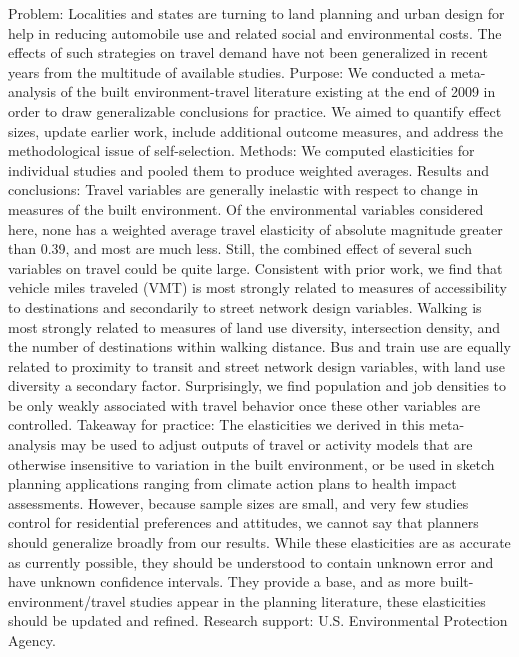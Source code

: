  Problem: Localities and states are turning to land planning and urban design for help in reducing automobile use and related social and environmental costs. The effects of such strategies on travel demand have not been generalized in recent years from the multitude of available studies. Purpose: We conducted a meta-analysis of the built environment-travel literature existing at the end of 2009 in order to draw generalizable conclusions for practice. We aimed to quantify effect sizes, update earlier work, include additional outcome measures, and address the methodological issue of self-selection. Methods: We computed elasticities for individual studies and pooled them to produce weighted averages. Results and conclusions: Travel variables are generally inelastic with respect to change in measures of the built environment. Of the environmental variables considered here, none has a weighted average travel elasticity of absolute magnitude greater than 0.39, and most are much less. Still, the combined effect of several such variables on travel could be quite large. Consistent with prior work, we find that vehicle miles traveled (VMT) is most strongly related to measures of accessibility to destinations and secondarily to street network design variables. Walking is most strongly related to measures of land use diversity, intersection density, and the number of destinations within walking distance. Bus and train use are equally related to proximity to transit and street network design variables, with land use diversity a secondary factor. Surprisingly, we find population and job densities to be only weakly associated with travel behavior once these other variables are controlled. Takeaway for practice: The elasticities we derived in this meta-analysis may be used to adjust outputs of travel or activity models that are otherwise insensitive to variation in the built environment, or be used in sketch planning applications ranging from climate action plans to health impact assessments. However, because sample sizes are small, and very few studies control for residential preferences and attitudes, we cannot say that planners should generalize broadly from our results. While these elasticities are as accurate as currently possible, they should be understood to contain unknown error and have unknown confidence intervals. They provide a base, and as more built-environment/travel studies appear in the planning literature, these elasticities should be updated and refined. Research support: U.S. Environmental Protection Agency. 